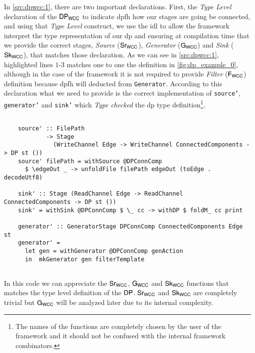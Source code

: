 In \autoref{src:dpwcc:1}, there are two important declarations. First, the \textit{Type Level} declaration of the $\mathsf{DP_{WCC}}$ to indicate \acrshort{dpfh} how our stages are going be connected, and
using that \textit{Type Level} construct, we use the \acrshort{idl} to allow the framework interpret the type representation of our \acrshort{dp} and ensuring at compilation time that we provide the correct stages,  \textit{Source} ($\mathsf{Sr_{WCC}}$), \textit{Generator} ($\mathsf{G_{WCC}}$) and \textit{Sink} ($\mathsf{Sk_{WCC}}$), that matches those declaration. As we can see in \autoref{src:dpwcc:1}, highlighted lines $1$-$3$ matches one to one the definition in \autoref{fig:dp_example_0}, although in the case of the framework it is not required to provide \textit{Filter} ($\mathsf{F_{WCC}}$) definition because \acrshort{dpfh} will deducted from \texttt{Generator}.
According to this declaration what we need to provide is the correct implementation of \texttt{source'}, \texttt{generator'} and \texttt{sink'}
which \textit{Type checked} the \acrshort{dp} type definition\footnote{The names of the functions are completely chosen by the user of the framework and it should not be confused with the internal framework combinators.}.

\begin{listing}[H]
  \begin{verbatim}
    
    source' :: FilePath
            -> Stage
              (WriteChannel Edge -> WriteChannel ConnectedComponents -> DP st ())
    source' filePath = withSource @DPConnComp
      $ \edgeOut _ -> unfoldFile filePath edgeOut (toEdge . decodeUtf8)

    sink' :: Stage (ReadChannel Edge -> ReadChannel ConnectedComponents -> DP st ())
    sink' = withSink @DPConnComp $ \_ cc -> withDP $ foldM_ cc print

    generator' :: GeneratorStage DPConnComp ConnectedComponents Edge st
    generator' =
      let gen = withGenerator @DPConnComp genAction
      in  mkGenerator gen filterTemplate
        
  \end{verbatim}
  \caption[{[\texttt{ConnectedComp.hs}] $\iwc$, $\gwc$ $\owc$ Code}]{In this code we can appreciate the $\iwc$, $\gwc$ and $\owc$ functions that matches the type level definition of the $\DP$. $\iwc$ and $\owc$ are completely trivial but $\gwc$ will be analyzed later due to its internal complexity.}
  \label{src:dpwcc:2}
\end{listing}

